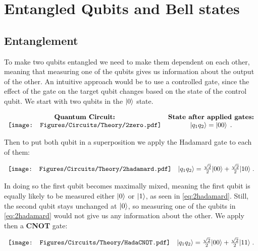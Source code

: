\section{Entangled Qubits and Bell states}

\subsection{Entanglement}


To make two qubits entangled we need to make them dependent on each other, meaning that measuring one of the qubits gives us information about the output of the other. An intuitive approach would be to use a controlled gate, since the effect of the gate on the target qubit changes based on the state of the control qubit.
We start with two qubits in the $\ket{0}$ state.

\begin{equation}
    \begin{array}{cc}
        \textbf{Quantum Circuit:}  & \textbf{State after applied gates:} \\
        \texttt{[image: Figures/Circuits/Theory/2zero.pdf]} &  \ket{q_1 q_2} = \ket{00} \; .
    \end{array}
\end{equation}

Then to put both qubit in a superposition we apply the Hadamard gate to each of them:

\begin{equation}\label{eq:2hadamard}
    \begin{array}{cc}
        \texttt{[image: Figures/Circuits/Theory/2hadamard.pdf]} &  \ket{q_1 q_2} = \frac{\sqrt{2}}{2} |00\rangle+\frac{\sqrt{2}}{2} |10\rangle \; .
    \end{array}
\end{equation}


In doing so the first qubit becomes maximally mixed, meaning the first qubit is equally likely to be measured either $\ket{0}$ or $\ket{1}$, as seen in \ref{eq:2hadamard}. Still, the second qubit stays unchanged at $\ket{0}$, so measuring one of the qubits in \ref{eq:2hadamard} would not give us any information about the other. We apply then a \textbf{CNOT} gate:

\begin{equation}\label{eq:Bell1}
    \begin{array}{cc}
        \texttt{[image: Figures/Circuits/Theory/HadaCNOT.pdf]} &  \ket{q_1 q_2} = \frac{\sqrt{2}}{2} |00\rangle+\frac{\sqrt{2}}{2} |11\rangle \; .
    \end{array}
\end{equation}

